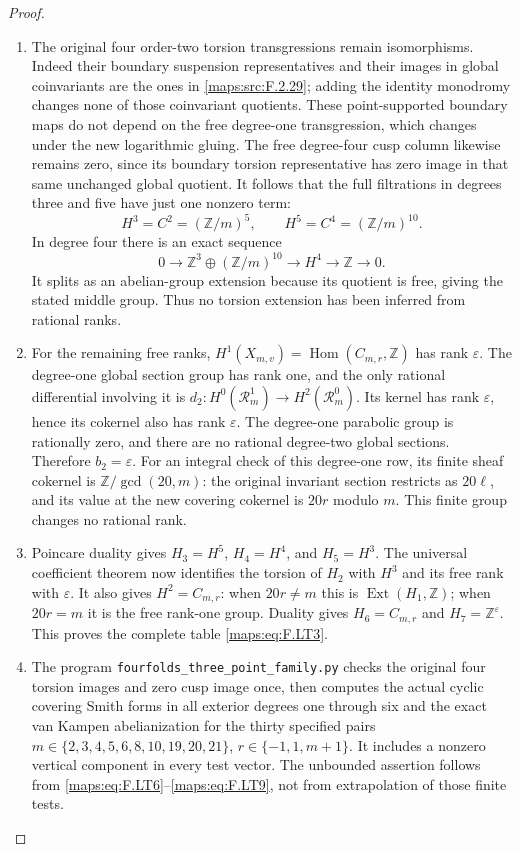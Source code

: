 \begin{proof}
\begin{enumerate}[label=\arabic*.]
\item The original four order-two torsion transgressions
remain isomorphisms.
Indeed their boundary suspension representatives and
their images in global coinvariants are the ones in
\ref{maps:src:F.2.29}; adding the identity monodromy changes none
of those coinvariant quotients.
These point-supported boundary maps do not depend
on the free degree-one transgression, which changes
under the new logarithmic gluing.
The free degree-four cusp column likewise remains
zero, since its boundary torsion representative has
zero image in that same unchanged global quotient.
It follows that the full filtrations in degrees
three and five have just one nonzero term:
\[
 H^3=C^2=(\mathbb Z/m)^5,\qquad
 H^5=C^4=(\mathbb Z/m)^{10}.
\tag{F.LT9}\label{maps:eq:F.LT9}
\]
In degree four there is an exact sequence
\[
 0\longrightarrow
       \mathbb Z^3\oplus(\mathbb Z/m)^{10}
  \longrightarrow H^4
  \longrightarrow\mathbb Z\longrightarrow0.
\]
It splits as an abelian-group extension because
its quotient is free, giving the stated middle group.
Thus no torsion extension has been inferred from
rational ranks.

\item For the remaining free ranks,
$H^1(X_{m,v})=\operatorname{Hom}(C_{m,r},\mathbb Z)$
has rank $\varepsilon$.
The degree-one global section group has rank one,
and the only rational differential involving it is
$d_2:H^0(\mathcal R_m^1)\to H^2(\mathcal R_m^0)$.
Its kernel has rank $\varepsilon$, hence its
cokernel also has rank $\varepsilon$.
The degree-one parabolic group is rationally zero,
and there are no rational degree-two global sections.
Therefore $b_2=\varepsilon$.
For an integral check of this degree-one row, its
finite sheaf cokernel is
$\mathbb Z/\gcd(20,m)$: the original invariant
section restricts as $20\ell$, and its value at
the new covering cokernel is $20r$ modulo $m$.
This finite group changes no rational rank.

\item Poincare duality gives
$H_3=H^5$, $H_4=H^4$, and $H_5=H^3$.
The universal coefficient theorem now identifies
the torsion of $H_2$ with $H^3$ and its free rank
with $\varepsilon$.
It also gives $H^2=C_{m,r}$: when $20r\ne m$ this
is $\operatorname{Ext}(H_1,\mathbb Z)$; when
$20r=m$ it is the free rank-one group.
Duality gives $H_6=C_{m,r}$ and
$H_7=\mathbb Z^\varepsilon$.
This proves the complete table \eqref{maps:eq:F.LT3}.

\item The program \texttt{fourfolds\_three\_point\_family.py}
checks the original four torsion images and zero
cusp image once, then computes the actual cyclic
covering Smith forms in all exterior degrees one
through six and the exact van Kampen abelianization
for the thirty specified pairs
$m\in\{2,3,4,5,6,8,10,19,20,21\}$,
$r\in\{-1,1,m+1\}$.
It includes a nonzero vertical component in every
test vector.
The unbounded assertion follows from \eqref{maps:eq:F.LT6}--\eqref{maps:eq:F.LT9},
not from extrapolation of those finite tests.

\end{enumerate}
\end{proof}




